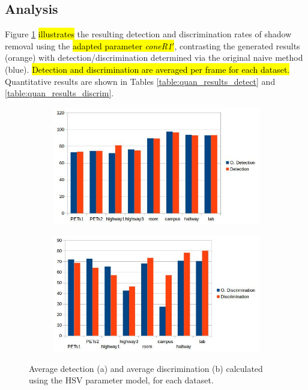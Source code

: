 \documentclass[12pt]{report}
\begin{document}
\subsection{Analysis}

Figure \ref{fig:bars_hsv_calc} \hl{illustrates} the resulting detection and discrimination rates of shadow removal using the \hl{adapted parameter \textit{coneR1}$'$}, contrasting the generated results (orange) with detection/discrimination determined via the original naive method (blue). \hl{Detection and discrimination are averaged per frame for each dataset.} Quantitative results are shown in Tables \ref{table:quan_results_detect} and \ref{table:quan_results_discrim}.

\begin{figure}
\centering
\begin{subfigure}{1\linewidth}
  \includegraphics[width=1\linewidth]{figures/model/detect_hsv.jpg}
  \caption{}
\end{subfigure}
\hfill
\begin{subfigure}{1\linewidth}
  \includegraphics[width=1\linewidth]{figures/model/discrim_hsv.jpg}
  \caption{}
\end{subfigure}

\caption{Average detection (a) and average discrimination (b) calculated using the HSV parameter model, for each dataset.}
\label{fig:bars_hsv_calc}
\end{figure}
\end{document}
